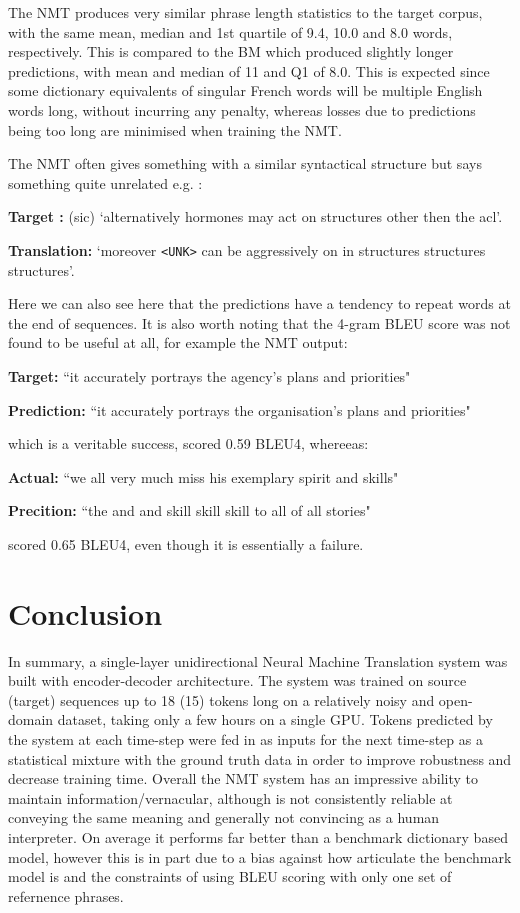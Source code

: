 \documentclass[]{article}
\begin{document}
The NMT produces very similar phrase length statistics to the target corpus, with the same mean, median and 1st quartile of 9.4, 10.0 and 8.0 words, respectively. This is compared to the BM which produced slightly longer predictions, with mean and median of 11 and Q1 of 8.0. This is expected since some dictionary equivalents of singular French words will be multiple English words long, without incurring any penalty, whereas losses due to predictions being too long are minimised when training the NMT.

The NMT often gives something with a similar syntactical structure but says something quite unrelated e.g. :
\begin{center}
	\textbf{Target :} (sic) `alternatively hormones may act on structures other then the acl'.
	
	\textbf{Translation:} `moreover \lstinline{<UNK>} can be aggressively on in structures structures structures'.
\end{center}
Here we can also see here that the predictions have a tendency to repeat words at the end of sequences. It is also worth noting that the 4-gram BLEU score was not found to be useful at all, for example the NMT output: 
\begin{center}
	\textbf{Target:} ``it accurately portrays the agency's plans and priorities"

\textbf{Prediction:} ``it accurately portrays the organisation's plans and priorities"
\end{center}
which is a veritable success, scored 0.59 BLEU4, whereeas:
\begin{center}
	\textbf{Actual:} ``we all very much miss his exemplary spirit and skills"

\textbf{Precition:} ``the and and skill skill skill to all of all stories"
\end{center}
scored 0.65 BLEU4, even though it is essentially a failure.
\section{Conclusion}
In summary, a single-layer unidirectional Neural Machine Translation system was built with encoder-decoder architecture. The system was trained on source (target) sequences up to 18 (15) tokens long on a relatively noisy and open-domain dataset, taking only a few hours on a single GPU. Tokens predicted by the system at each time-step were fed in as inputs for the next time-step as a statistical mixture with the ground truth data in order to improve robustness and decrease training time.
Overall the NMT system has an impressive ability to maintain information/vernacular, although is not consistently reliable at conveying the same meaning and generally not convincing as a human interpreter. On average it performs far better than a benchmark dictionary based model, however this is in part due to a bias against how articulate the benchmark model is and the constraints of using BLEU scoring with only one set of refernence phrases.
\end{document}
